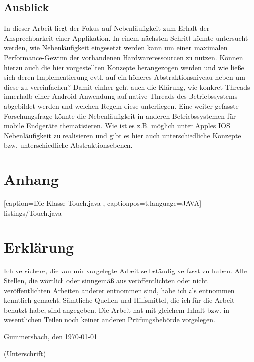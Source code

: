 \documentclass[12pt,oneside,a4paper,bibtotoc,liststotoc]{scrreprt}
\begin{document}
\section{Ausblick}%
In dieser Arbeit liegt der Fokus auf Nebenläufigkeit zum Erhalt der Ansprechbarkeit einer Applikation. In einem nächsten Schritt könnte untersucht werden, wie Nebenläufigkeit eingesetzt werden kann um einen maximalen Performance-Gewinn der vorhandenen Hardwareressourcen zu nutzen. Können hierzu auch die hier vorgestellten Konzepte herangezogen werden und wie ließe sich deren Implementierung evtl. auf ein höheres Abstraktionsniveau heben um diese zu vereinfachen? Damit einher geht auch die Klärung, wie konkret Threads innerhalb einer Android Anwendung auf native Threads des Betriebssystems abgebildet werden und welchen Regeln diese unterliegen. Eine weiter gefasste Forschungsfrage könnte die Nebenläufigkeit in anderen Betriebssystemen für mobile Endgeräte thematisieren. Wie ist es z.B. möglich unter Apples IOS Nebenläufigkeit zu realisieren und gibt es hier auch unterschiedliche Konzepte bzw. unterschiedliche Abstraktionsebenen.






{}

\appendix

\chapter*{Anhang}
 
    [caption={Die Klasse Touch.java}
       \label{lst:javaclass},
       captionpos=t,language=JAVA]
 {listings/Touch.java}
\chapter{Erklärung}

Ich versichere, die von mir vorgelegte Arbeit selbständig verfasst zu
haben. Alle Stellen, die wörtlich oder sinngemäß aus veröffentlichten
oder nicht veröffentlichten Arbeiten anderer entnommen sind, habe ich
als entnommen kenntlich gemacht. Sämtliche Quellen und Hilfsmittel,
die ich für die Arbeit benutzt habe, sind angegeben. Die Arbeit hat
mit gleichem Inhalt bzw. in wesentlichen Teilen noch keiner anderen
Prüfungsbehörde vorgelegen.

\bigskip

Gummersbach, den \today

\bigskip

\bigskip

\bigskip

\bigskip

\bigskip

\bigskip

(Unterschrift)
\end{document}
